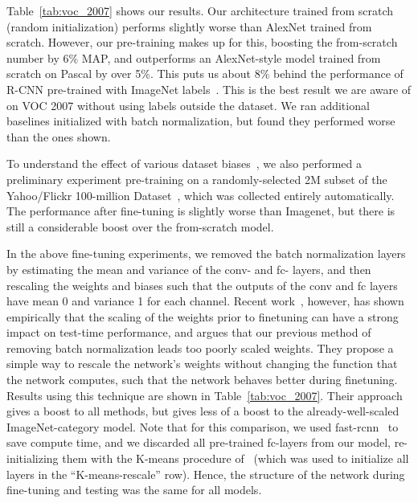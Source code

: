 \documentclass[10pt,twocolumn,letterpaper]{article}
\begin{document}
Table~\ref{tab:voc_2007} shows our results.  Our architecture trained from scratch (random initialization) performs slightly worse than AlexNet trained from scratch.  %
However, our pre-training makes up for this, boosting the from-scratch number by 6\% MAP, and outperforms an AlexNet-style model trained from scratch on Pascal by over 5\%.  This puts us about 8\% behind
the performance of R-CNN pre-trained with ImageNet labels~\cite{girshick2014rich}.  This is the best result we are aware of on VOC 2007 without using labels outside the dataset.  We ran additional baselines initialized with batch normalization, but found they performed worse than the ones shown.

To understand the effect of various dataset biases~\cite{torralba11}, we also performed a preliminary experiment pre-training on a randomly-selected 2M subset of the Yahoo/Flickr 100-million Dataset~\cite{thomee2015yfcc100m}, which was collected entirely automatically.  The performance after fine-tuning is slightly worse than Imagenet, but there is still a considerable boost over the from-scratch model. 


In the above fine-tuning experiments, we removed the batch normalization layers by estimating the
mean and variance of the conv- and fc- layers, and then rescaling the weights and biases such that the outputs of the conv and fc layers have mean 0 and variance 1 for each channel.  
Recent work~\cite{krahenbuhl2015data},
however, has shown empirically that the scaling of the weights prior to finetuning can have a
strong impact on test-time performance, and argues that our previous method of
removing batch normalization leads too poorly scaled weights.  They propose a simple way to
rescale the network's weights without changing the function that the network computes, such that
the network behaves better during finetuning.  Results using this technique are shown 
in Table~\ref{tab:voc_2007}.
Their approach gives a boost to all methods, but gives less of a boost to the 
already-well-scaled ImageNet-category model.  Note that for this comparison, we 
used fast-rcnn~\cite{girshickICCV15fastrcnn} to save compute time, and we discarded all 
pre-trained fc-layers from our model, re-initializing them with the K-means procedure 
of~\cite{krahenbuhl2015data}
(which was used to initialize all layers in the ``K-means-rescale'' row).  
Hence, the structure of the network during
fine-tuning and testing was the
same for all models.
\end{document}
